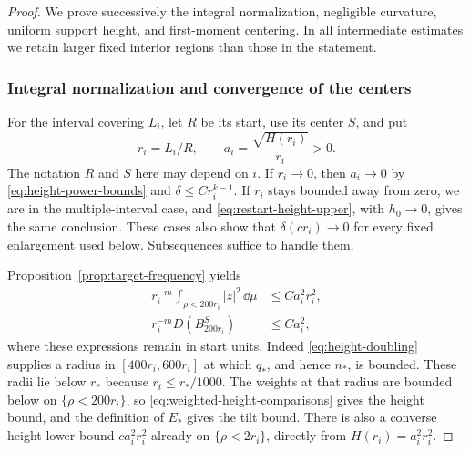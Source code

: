 \begin{proof}
We prove successively the integral normalization, negligible curvature,
uniform support height, and first-moment centering. In all intermediate
estimates we retain larger fixed interior regions than those in the
statement.

\subsubsection*{Integral normalization and convergence of the centers}
For the interval covering $L_i$, let $R$ be its start, use its center
$S$, and put
\begin{equation}\label{eq:height-normalization}
 r_i=L_i/R,\qquad a_i=\frac{\sqrt{H(r_i)}}{r_i}>0.
\end{equation}
The notation $R$ and $S$ here may depend on $i$. If $r_i\to0$,
then $a_i\to0$ by \eqref{eq:height-power-bounds} and
$\delta\le Cr_i^{k-1}$. If $r_i$ stays bounded away from zero,
we are in the multiple-interval case, and
\eqref{eq:restart-height-upper}, with $h_0\to0$, gives the same
conclusion. These cases also show that $\delta(cr_i)\to0$ for every
fixed enlargement used below. Subsequences suffice to handle them.

Proposition~\ref{prop:target-frequency} yields
\begin{equation}\label{eq:target-energy}
 \begin{aligned}
 r_i^{-m}\int_{\rho<200r_i}|z|^2\,\dd\mu
        &\le Ca_i^2r_i^2,\\
 r_i^{-m}D(B^S_{200r_i})&\le Ca_i^2,
 \end{aligned}
\end{equation}
where these expressions remain in start units. Indeed
\eqref{eq:height-doubling} supplies a radius in
$[400r_i,600r_i]$ at which $q_*$, and hence $n_*$, is bounded.
These radii lie below $r_*$ because $r_i\le r_*/1000$.
The weights at that radius are bounded below on
$\{\rho<200r_i\}$, so
\eqref{eq:weighted-height-comparisons} gives the height bound, and
the definition of $E_*$ gives the tilt bound. There is also a converse
height lower bound $ca_i^2r_i^2$ already on $\{\rho<2r_i\}$,
directly from $H(r_i)=a_i^2r_i^2$.


\end{proof}
